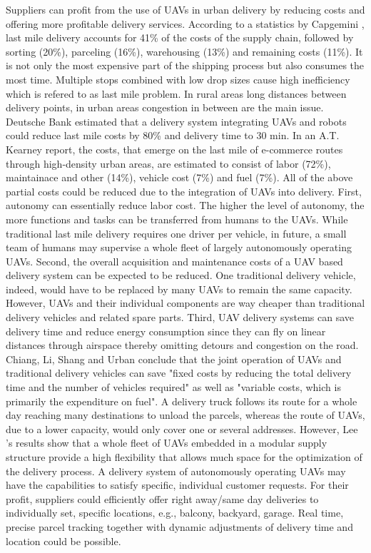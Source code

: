 Suppliers can profit from the use of UAVs in urban delivery by reducing costs and offering more profitable delivery services.
According to a statistics by Capgemini \cite{Jacobs2019}, last mile delivery accounts for 41\% of the costs of the supply chain, 
followed by sorting (20\%), parceling (16\%), warehousing (13\%) and remaining costs (11\%).
It is not only the most expensive part of the shipping process but also consumes the most time. \cite{Dolan2018}
Multiple stops combined with low drop sizes cause high inefficiency which is refered to as last mile problem. \cite{Dolan2018}
In rural areas long distances between delivery points, in urban areas congestion in between are the main issue. \cite{Dolan2018}
Deutsche Bank estimated that a delivery system integrating UAVs and robots could reduce last mile costs by 80\%
and delivery time to 30 min. \cite{Kim2016}
In an A.T. Kearney \cite{Kearney2018} report, the costs, that emerge on the last mile of e-commerce routes through high-density urban areas,
are estimated to consist of labor (72\%), maintainace and other (14\%), vehicle cost (7\%) and fuel (7\%).
All of the above partial costs could be reduced due to the integration of UAVs into delivery.
First, autonomy can essentially reduce labor cost. 
The higher the level of autonomy, the more functions and tasks can be transferred from humans to the UAVs.
While traditional last mile delivery requires one driver per vehicle, 
in future, a small team of humans may supervise a whole fleet of largely autonomously operating UAVs.
Second, the overall acquisition and maintenance costs of a UAV based delivery system can be expected to be reduced.
One traditional delivery vehicle, indeed, would have to be replaced by many UAVs to remain the same capacity.
However, UAVs and their individual components are way cheaper than traditional delivery vehicles and related spare parts.
Third, UAV delivery systems can save delivery time and reduce energy consumption 
since they can fly on linear distances through airspace thereby omitting detours and congestion on the road. 
Chiang, Li, Shang and Urban \cite{Chiang2019} conclude that the joint operation of UAVs and traditional delivery vehicles can save 
"fixed costs by reducing the total delivery time and the number of vehicles required"
as well as "variable costs, which is primarily the expenditure on fuel".
A delivery truck follows its route for a whole day reaching many destinations to unload the parcels,
whereas the route of UAVs, due to a lower capacity, would only cover one or several addresses. 
However, Lee \cite{Lee2017}'s results show that a whole fleet of UAVs embedded in a modular supply structure provide a high flexibility 
that allows much space for the optimization of the delivery process.
A delivery system of autonomously operating UAVs may have the capabilities to satisfy specific, individual customer requests.
For their profit, suppliers could efficiently offer right away/same day deliveries to individually set, specific locations, e.g., balcony, backyard, garage.
Real time, precise parcel tracking together with dynamic adjustments of delivery time and location could be possible.

